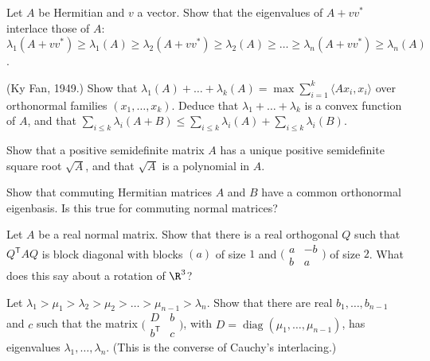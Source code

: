 \begin{exercise}[$\star\star$]\label{linear:ex:rankone}
Let $A$ be Hermitian and $v$ a vector. Show that the eigenvalues of $A+vv^*$ interlace those of $A$:
$\lambda_1(A+vv^*)\ge\lambda_1(A)\ge\lambda_2(A+vv^*)\ge\lambda_2(A)\ge\dots\ge\lambda_n(A+vv^*)\ge\lambda_n(A)$.
\end{exercise}

\begin{exercise}[$\star\star$]\label{linear:ex:kyfan}
(Ky Fan, 1949.) Show that $\lambda_1(A)+\dots+\lambda_k(A)=\max\sum_{i=1}^k\langle Ax_i,x_i\rangle$ over orthonormal families
$(x_1,\dots,x_k)$. Deduce that $\lambda_1+\dots+\lambda_k$ is a convex function of $A$, and that
$\sum_{i\le k}\lambda_i(A+B)\le\sum_{i\le k}\lambda_i(A)+\sum_{i\le k}\lambda_i(B)$.
\end{exercise}

\begin{exercise}[$\star\star$]\label{linear:ex:sqrtpsd}
Show that a positive semidefinite matrix $A$ has a unique positive semidefinite square root $\sqrt A$, and that $\sqrt A$
is a polynomial in $A$.
\end{exercise}

\begin{exercise}[$\star\star$]\label{linear:ex:simultaneous}
Show that commuting Hermitian matrices $A$ and $B$ have a common orthonormal eigenbasis. Is this true for commuting normal
matrices?
\end{exercise}

\begin{exercise}[$\star\star$]\label{linear:ex:realnormal}
Let $A$ be a real normal matrix. Show that there is a real orthogonal $Q$ such that $Q^{\mathsf T}AQ$ is block diagonal
with blocks $(a)$ of size $1$ and $\bigl(\begin{smallmatrix}a&-b\\b&a\end{smallmatrix}\bigr)$ of size $2$. What does this say
about a rotation of $\R^3$?
\end{exercise}

\begin{exercise}[$\star\star\star$]\label{linear:ex:bordered}
Let $\lambda_1>\mu_1>\lambda_2>\mu_2>\dots>\mu_{n-1}>\lambda_n$. Show that there are real $b_1,\dots,b_{n-1}$ and $c$ such that
the matrix $\bigl(\begin{smallmatrix}D&b\\b^{\mathsf T}&c\end{smallmatrix}\bigr)$, with $D=\operatorname{diag}(\mu_1,\dots,
\mu_{n-1})$, has eigenvalues $\lambda_1,\dots,\lambda_n$. (This is the converse of Cauchy's interlacing.)
\end{exercise}


